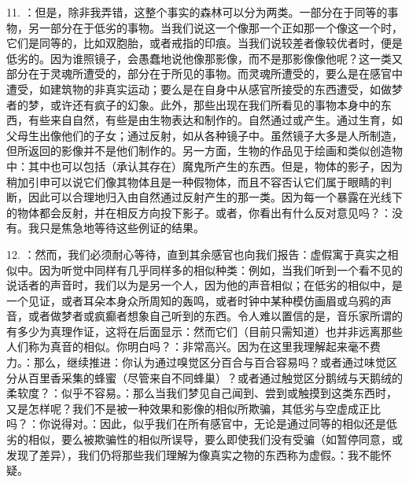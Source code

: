11. ：但是，除非我弄错，这整个事实的森林可以分为两类。一部分在于同等的事物，另一部分在于低劣的事物。当我们说这一个像那一个正如那一个像这一个时，它们是同等的，比如双胞胎，或者戒指的印痕。当我们说较差者像较优者时，便是低劣的。因为谁照镜子，会愚蠢地说他像那影像，而不是那影像像他呢？这一类又部分在于灵魂所遭受的，部分在于所见的事物。而灵魂所遭受的，要么是在感官中遭受，如建筑物的非真实运动；要么是在自身中从感官所接受的东西遭受，如做梦者的梦，或许还有疯子的幻象。此外，那些出现在我们所看见的事物本身中的东西，有些来自自然，有些是由生物表达和制作的。自然通过或产生。通过生育，如父母生出像他们的子女；通过反射，如从各种镜子中。虽然镜子大多是人所制造，但所返回的影像并不是他们制作的。另一方面，生物的作品见于绘画和类似创造物中：其中也可以包括（承认其存在）魔鬼所产生的东西。但是，物体的影子，因为稍加引申可以说它们像其物体且是一种假物体，而且不容否认它们属于眼睛的判断，因此可以合理地归入由自然通过反射产生的那一类。因为每一个暴露在光线下的物体都会反射，并在相反方向投下影子。或者，你看出有什么反对意见吗？：没有。我只是焦急地等待这些例证的结果。\par

12. ：然而，我们必须耐心等待，直到其余感官也向我们报告：虚假寓于真实之相似中。因为听觉中同样有几乎同样多的相似种类：例如，当我们听到一个看不见的说话者的声音时，我们以为是另一个人，因为他的声音相似；在低劣的相似中，是一个见证，或者耳朵本身众所周知的轰鸣，或者时钟中某种模仿画眉或乌鸦的声音，或者做梦者或疯癫者想象自己听到的东西。令人难以置信的是，音乐家所谓的有多少为真理作证，这将在后面显示：然而它们（目前只需知道）也并非远离那些人们称为真音的相似。你明白吗？：非常高兴。因为在这里我理解起来毫不费力。：那么，继续推进：你认为通过嗅觉区分百合与百合容易吗？或者通过味觉区分从百里香采集的蜂蜜（尽管来自不同蜂巢）？或者通过触觉区分鹅绒与天鹅绒的柔软度？：似乎不容易。：那么当我们梦见自己闻到、尝到或触摸到这类东西时，又是怎样呢？我们不是被一种效果和影像的相似所欺骗，其低劣与空虚成正比吗？：你说得对。：因此，似乎我们在所有感官中，无论是通过同等的相似还是低劣的相似，要么被欺骗性的相似所误导，要么即使我们没有受骗（如暂停同意，或发现了差异），我们仍将那些我们理解为像真实之物的东西称为虚假。：我不能怀疑。\par

